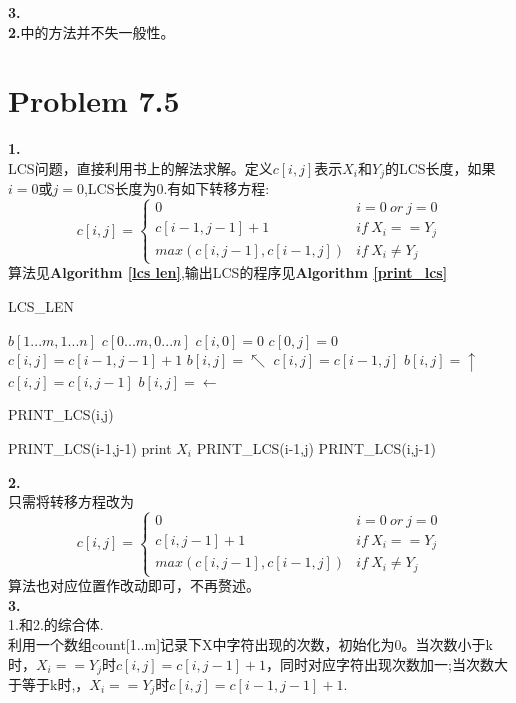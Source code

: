 \documentclass[onecolumn]{ctexart}
\begin{document}
\noindent \textbf{3.}\\
\indent \textbf{2.}中的方法并不失一般性。\\
\section*{Problem 7.5}
\noindent \textbf{1.}\\
\indent LCS问题，直接利用书上的解法求解。定义$c[i,j]$表示$X_i$和$Y_j$的LCS长度，如果$i=0$或$j=0$,LCS长度为0.有如下转移方程:
\[
	c[i,j]=
	\begin{cases}
	0&i=0\ or\ j=0\\
	c[i-1,j-1]+1 &if\ X_i==Y_j\\
	max(c[i,j-1],c[i-1,j]) &if\ X_i\neq Y_j
	\end{cases}
\]
算法见\textbf{Algorithm \ref{lcs len}},输出LCS的程序见\textbf{Algorithm \ref{print_lcs}}
\begin{algorithm}[htbp]
	\caption{LCS\_LEN}
	\label{lcs len}
	\begin{algorithmic}[1]
	\STATE $b[1...m,1...n]$
	\STATE $c[0...m,0...n]$
	 	\STATE $c[i,0]=0$
	\ENDFOR
		\STATE $c[0,j]=0$
	\ENDFOR	
			\STATE $c[i,j]=c[i-1,j-1]+1$
			\STATE $b[i,j]=\nwarrow$
			\STATE $c[i,j]=c[i-1,j]$
			\STATE $b[i,j]=\uparrow$
		\ELSE
			\STATE $c[i,j]=c[i,j-1]$
			\STATE $b[i,j]=\leftarrow$
		\ENDIF
		\ENDFOR
	\ENDFOR
	\end{algorithmic}
\end{algorithm}

\begin{algorithm}[htbp]
	\caption{PRINT\_LCS(i,j)}
	\label{print_lcs}
	\begin{algorithmic}[1]
			\RETURN { }
		\ENDIF
			\STATE PRINT\_LCS(i-1,j-1)
			\STATE print $X_i$
			\STATE PRINT\_LCS(i-1,j)
		\ELSE
			\STATE PRINT\_LCS(i,j-1)
		\ENDIF
	\end{algorithmic}
\end{algorithm}


\noindent \textbf{2.}\\
	\indent 只需将转移方程改为
	\[
	c[i,j]=
	\begin{cases}
	0&i=0\ or\ j=0\\
	c[i,j-1]+1 &if\ X_i==Y_j\\
	max(c[i,j-1],c[i-1,j]) &if\ X_i\neq Y_j
	\end{cases}
	\] 
	算法也对应位置作改动即可，不再赘述。\\
\noindent \textbf{3.}\\
\indent 1.和2.的综合体.\\
\indent 利用一个数组count[1..m]记录下X中字符出现的次数，初始化为0。当次数小于k时，$X_i==Y_j$时$c[i,j]=c[i,j-1]+1$，同时对应字符出现次数加一;当次数大于等于k时,，$X_i==Y_j$时$c[i,j]=c[i-1,j-1]+1$.
\end{document}
